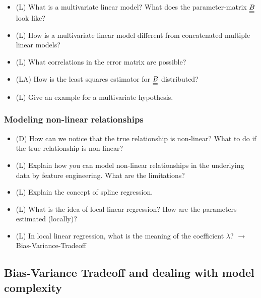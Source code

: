 \begin{itemize}
\begin{itemize}
    \end{itemize}
    \item (L) What is a multivariate linear model? What does the parameter-matrix $\mat{B}$ look like?
    \item (L) How is a multivariate linear model different from concatenated multiple linear models?
    \item (L) What correlations in the error matrix are possible?
    \item (LA) How is the least squares estimator for $\mat{B}$ distributed?
    \item (L) Give an example for a multivariate hypothesis.
\end{itemize}

\subsubsection*{Modeling non-linear relationships}
\begin{itemize}
    \item (D) How can we notice that the true relationship is non-linear? What to do if the true relationship is non-linear?
    \item (L) Explain how you can model non-linear relationships in the underlying data by feature engineering. What are the limitations?
    \item (L) Explain the concept of spline regression.
    \item (L) What is the idea of local linear regression? How are the parameters estimated (locally)?
    \item (L) In local linear regression, what is the meaning of the coefficient $\lambda$? $\rightarrow$ Bias-Variance-Tradeoff
\end{itemize}

\subsection*{Bias-Variance Tradeoff and dealing with model complexity}

